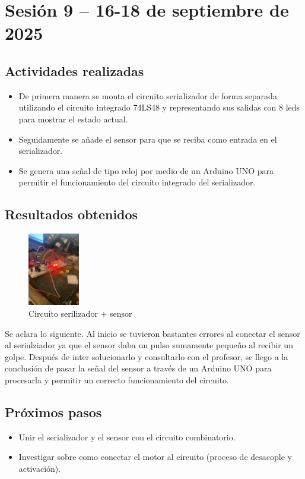 \documentclass[12pt,letterpaper]{article}
\begin{document}
\section{Sesión 9 -- 16-18 de septiembre de 2025}
\subsection*{Actividades realizadas}
\begin{itemize}
    \item De primera manera se monta el circuito serializador de forma separada utilizando el circuito integrado 74LS48 y representando sus salidas con 8 leds para mostrar el estado actual.
    \item Seguidamente se añade el sensor para que se reciba como entrada en el serializador.
    \item Se genera una señal de tipo reloj por medio de un Arduino UNO para permitir el funcionamiento del circuito integrado del serializador.
\end{itemize}

\subsection*{Resultados obtenidos}
\begin{figure}[H]
    \centering
    \includegraphics[width=0.2\textwidth]{images/seri_real.png} %
    \caption{Circuito serilizador + sensor}
    \label{fig:todo_taller}
\end{figure}
Se aclara lo siguiente. Al inicio se tuvieron bastantes errores al conectar el sensor al serialziador ya que el sensor daba un pulso sumamente pequeño al recibir un golpe. Después de inter solucionarlo y consultarlo con el profesor, se llego a la conclusión de pasar la señal del sensor a través de un Arduino UNO para procesarla y permitir un correcto funcionamiento del circuito.

\subsection*{Próximos pasos}
\begin{itemize}
    \item Unir el serializador y el sensor con el circuito combinatorio.
    \item Investigar sobre como conectar el motor al circuito (proceso de desacople y activación).
\end{itemize}
\end{document}
